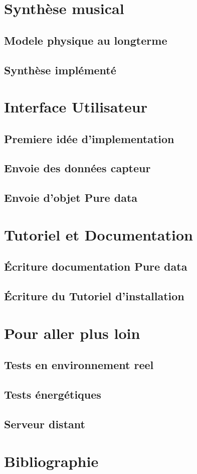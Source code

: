 \documentclass[a4paper, titlepage, oneside, 12pt]{article}%
\begin{document}
\newpage
\section{Synthèse musical}
\subsection{Modele physique au longterme}

\subsection{Synthèse implémenté}

\newpage
\section{Interface Utilisateur}
\subsection{Premiere idée d'implementation}

\subsection{Envoie des données capteur}

\subsection{Envoie d'objet Pure data}

\newpage
\section{Tutoriel et Documentation}
\subsection{Écriture documentation Pure data}
\subsection{Écriture du Tutoriel d'installation}

\newpage
\section{Pour aller plus loin}
\subsection{Tests en environnement reel}
\subsection{Tests énergétiques}
\subsection{Serveur distant}

\newpage
\section{Bibliographie}
\nocite{*}


\end{document}
